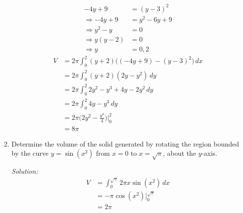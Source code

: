 \documentclass[16pt]{article}
\theoremstyle{remark}
\begin{document}
\begin{enumerate}
\begin{mdframed}[style=TheoremFrame]
\begin{align*}
-4y+9 &= (y-3)^2\\
\Rightarrow -4y+9 &= y^2-6y+9\\
\Rightarrow y^2-y &= 0\\
\Rightarrow y(y-2) &=0\\
\Rightarrow y &= 0,2
\end{align*}
\begin{align*}
V&= 2\pi \int_0^2 (y+2)\bigg((-4y+9) -(y-3)^2\bigg) \, dx\\
&= 2\pi \int_0^2 (y+2)(2y-y^2)\,dy\\
&= 2\pi \int_0^2 2y^2-y^3+4y-2y^2 \, dy\\
&= 2\pi \int_0^2 4y-y^3 \, dy\\
&= 2\pi \bigg(2y^2 - \frac{y^4}{4}\bigg) \bigg|_0^2\\
&= 8\pi
\end{align*}
\end{mdframed}
\item Determine the volume of the solid generated by rotating the region bounded by the curve $y=\sin(x^2)$ from $x=0$ to $x=\sqrt{\pi}$, about the $y$-axis.
\begin{mdframed}[style=TheoremFrame]
\textit{Solution:}
\begin{align*}
V&= \int_0^{\sqrt{\pi}} 2\pi x \sin(x^2) \, dx\\
&= -\pi \cos(x^2) \bigg|_0^{\sqrt{\pi}}\\
&= 2\pi
\end{align*}

\end{mdframed}
\end{enumerate}
\end{document}
